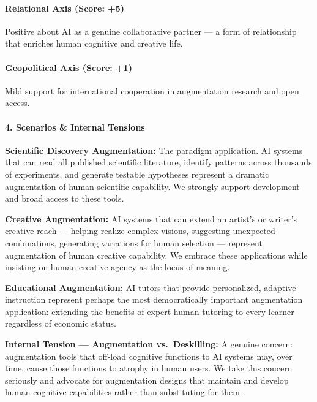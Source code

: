 \paragraph{Relational Axis (Score: +5)}\label{relational-axis-score-5-1}

Positive about AI as a genuine collaborative partner --- a form of
relationship that enriches human cognitive and creative life.

\paragraph{Geopolitical Axis (Score:
+1)}\label{geopolitical-axis-score-1}

Mild support for international cooperation in augmentation research and
open access.

\paragraph{4. Scenarios \& Internal
Tensions}\label{scenarios-internal-tensions-18}

\textbf{Scientific Discovery Augmentation:} The paradigm application. AI
systems that can read all published scientific literature, identify
patterns across thousands of experiments, and generate testable
hypotheses represent a dramatic augmentation of human scientific
capability. We strongly support development and broad access to these
tools.

\textbf{Creative Augmentation:} AI systems that can extend an artist's
or writer's creative reach --- helping realize complex visions,
suggesting unexpected combinations, generating variations for human
selection --- represent augmentation of human creative capability. We
embrace these applications while insisting on human creative agency as
the locus of meaning.

\textbf{Educational Augmentation:} AI tutors that provide personalized,
adaptive instruction represent perhaps the most democratically important
augmentation application: extending the benefits of expert human
tutoring to every learner regardless of economic status.

\textbf{Internal Tension --- Augmentation vs.~Deskilling:} A genuine
concern: augmentation tools that off-load cognitive functions to AI
systems may, over time, cause those functions to atrophy in human users.
We take this concern seriously and advocate for augmentation designs
that maintain and develop human cognitive capabilities rather than
substituting for them.

